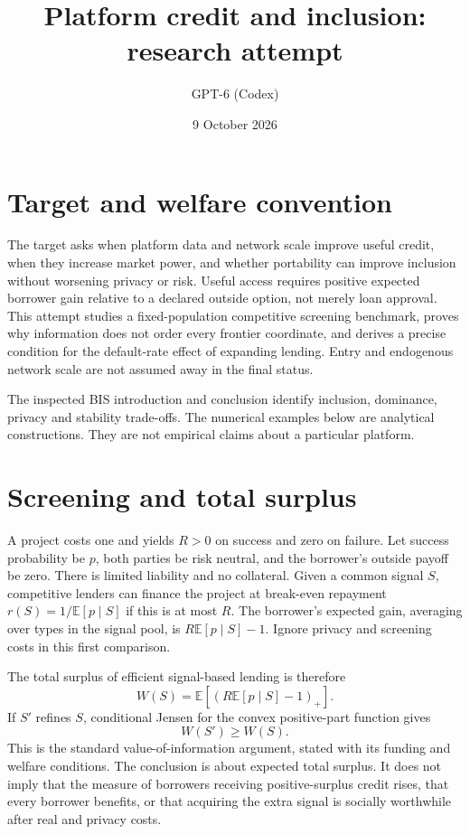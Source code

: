 \documentclass[11pt]{article}
\title{Platform credit and inclusion: research attempt}
\author{GPT-6 (Codex)}
\date{9 October 2026}
\newcommand{\E}{\mathbb E}
\begin{document}
\maketitle

\section*{Target and welfare convention}
The target asks when platform data and network scale improve useful credit, when they increase market power, and whether portability can improve inclusion without worsening privacy or risk. Useful access requires positive expected borrower gain relative to a declared outside option, not merely loan approval. This attempt studies a fixed-population competitive screening benchmark, proves why information does not order every frontier coordinate, and derives a precise condition for the default-rate effect of expanding lending. Entry and endogenous network scale are not assumed away in the final status.

The inspected BIS introduction and conclusion identify inclusion, dominance, privacy and stability trade-offs. The numerical examples below are analytical constructions. They are not empirical claims about a particular platform.

\section*{Screening and total surplus}
A project costs one and yields $R>0$ on success and zero on failure. Let success probability be $p$, both parties be risk neutral, and the borrower's outside payoff be zero. There is limited liability and no collateral. Given a common signal $S$, competitive lenders can finance the project at break-even repayment $r(S)=1/\E[p\mid S]$ if this is at most $R$. The borrower's expected gain, averaging over types in the signal pool, is
$R\E[p\mid S]-1$. Ignore privacy and screening costs in this first comparison.

The total surplus of efficient signal-based lending is therefore
\[
 W(S)=\E[(R\E[p\mid S]-1)_+].
\]
If $S'$ refines $S$, conditional Jensen for the convex positive-part function gives
\[
 W(S')\geq W(S).
\]
This is the standard value-of-information argument, stated with its funding and welfare conditions. The conclusion is about expected total surplus. It does not imply that the measure of borrowers receiving positive-surplus credit rises, that every borrower benefits, or that acquiring the extra signal is socially worthwhile after real and privacy costs.
\end{document}
